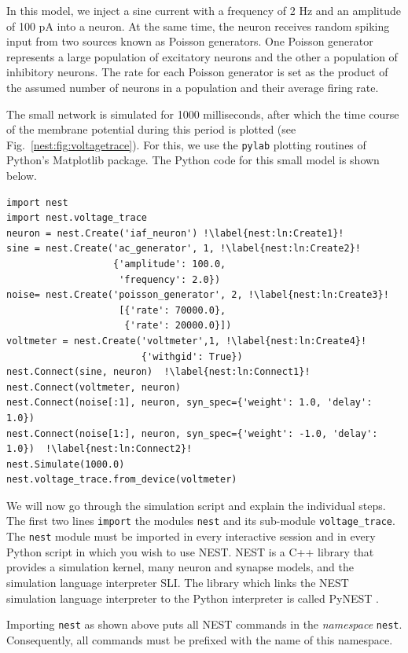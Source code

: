 \documentclass{article}
\begin{document}
In this model, we inject a sine current with a frequency of 2 Hz and
an amplitude of 100 pA into a neuron. At the same time, the neuron
receives random spiking input from two sources known as Poisson
generators. One Poisson generator represents a large population of
excitatory neurons and the other a population of inhibitory
neurons. The rate for each Poisson generator is set as the product of
the assumed number of neurons in a population and their average firing
rate.

The small network is simulated for 1000 milliseconds, after which the
time course of the membrane potential during this period is plotted
(see Fig.~\ref{nest:fig:voltagetrace}). For this, we use the
\lstinline!pylab! plotting routines of Python's Matplotlib package.
The Python code for this small model is shown below.

\begin{lstlisting}
import nest
import nest.voltage_trace
neuron = nest.Create('iaf_neuron') !\label{nest:ln:Create1}!
sine = nest.Create('ac_generator', 1, !\label{nest:ln:Create2}!
                   {'amplitude': 100.0,
                    'frequency': 2.0})
noise= nest.Create('poisson_generator', 2, !\label{nest:ln:Create3}!
                    [{'rate': 70000.0}, 
                     {'rate': 20000.0}])
voltmeter = nest.Create('voltmeter',1, !\label{nest:ln:Create4}!
                        {'withgid': True})
nest.Connect(sine, neuron)  !\label{nest:ln:Connect1}!
nest.Connect(voltmeter, neuron)
nest.Connect(noise[:1], neuron, syn_spec={'weight': 1.0, 'delay': 1.0}) 
nest.Connect(noise[1:], neuron, syn_spec={'weight': -1.0, 'delay': 1.0})  !\label{nest:ln:Connect2}!
nest.Simulate(1000.0)
nest.voltage_trace.from_device(voltmeter)
\end{lstlisting}
We will now go through the simulation script and explain the
individual steps. The first two lines \lstinline!import! the modules
\lstinline!nest!  and its sub-module \lstinline!voltage_trace!. The
\lstinline!nest!  module must be imported in every interactive session
and in every Python script in which you wish to use NEST. NEST is a
C++ library that provides a simulation kernel, many neuron and synapse
models, and the simulation language interpreter SLI. The library which
links the NEST simulation language interpreter to the Python
interpreter is called PyNEST \citep{Eppler09_12}. 

Importing \lstinline!nest! as shown above puts all NEST commands in
the \emph{namespace} \lstinline!nest!. Consequently, all commands must
be prefixed with the name of this namespace.
 
\end{document}
